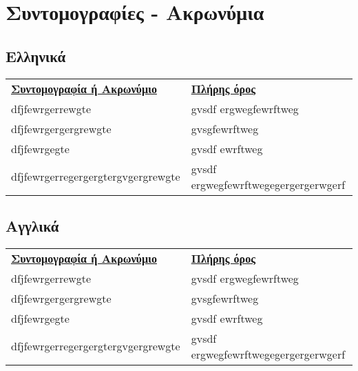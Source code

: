 \chapter{Συντομογραφίες - Ακρωνύμια}

\section{Ελληνικά}

\begin{flushleft}
    \begin{tabular}{ll}
        \large{\textbf{\underline{Συντομογραφία ή Ακρωνύμιο}}} & \large{\textbf{\underline{Πλήρης όρος}}} \\
        
        dfjfewrgerrewgte & gvsdf ergwegfewrftweg\\
        dfjfewrgergergrewgte & gvsgfewrftweg\\
        dfjfewrgegte & gvsdf ewrftweg\\
        dfjfewrgerregergergtergvgergrewgte & gvsdf ergwegfewrftwegegergergerwgerf
    \end{tabular}
    \end{flushleft}

\section{Αγγλικά}

\begin{flushleft}
    \begin{tabular}{ll}
        \large{\textbf{\underline{Συντομογραφία ή Ακρωνύμιο}}} & \large{\textbf{\underline{Πλήρης όρος}}} \\
        
        dfjfewrgerrewgte & gvsdf ergwegfewrftweg\\
        dfjfewrgergergrewgte & gvsgfewrftweg\\
        dfjfewrgegte & gvsdf ewrftweg\\
        dfjfewrgerregergergtergvgergrewgte & gvsdf ergwegfewrftwegegergergerwgerf
    \end{tabular}
    \end{flushleft}

